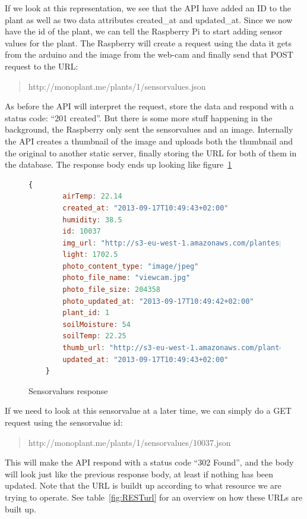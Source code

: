 If we look at this representation, we see that the API have added an ID to the plant as well as two data attributes created\_at and updated\_at. Since we now have the id of the plant, we can tell the Raspberry Pi to start adding sensor values for the plant. The Raspberry will create a request using the data it gets from the arduino and the image from the web-cam and finally send that POST request to the URL:

\begin{quote}
http://monoplant.me/plants/1/sensorvalues.json 
\end{quote}

As before the API will interpret the request, store the data and respond with a status code: “201 created”. But there is some more stuff happening in the background, the Raspberry only sent the sensorvalues and an image. Internally the API creates a thumbnail of the image and uploads both the thumbnail and the original to another static server, finally storing the URL for both of them in the database. The response body ends up looking like figure~\ref{fig:sensorvaluesresponse}

\begin{figure}
	\begin{lstlisting}[language=javascript]
	{
		airTemp: 22.14
		created_at: "2013-09-17T10:49:43+02:00"
		humidity: 38.5
		id: 10037
		img_url: "http://s3-eu-west-1.amazonaws.com/plantespann/2013/9/17/original/10037.jpg?1379407782"
		light: 1702.5
		photo_content_type: "image/jpeg"
		photo_file_name: "viewcam.jpg"
		photo_file_size: 204358
		photo_updated_at: "2013-09-17T10:49:42+02:00"
		plant_id: 1
		soilMoisture: 54
		soilTemp: 22.25
		thumb_url: "http://s3-eu-west-1.amazonaws.com/plantespann/2013/9/17/thumb/10037.jpg?1379407782"
		updated_at: "2013-09-17T10:49:43+02:00"
	}
	\end{lstlisting}
	\caption{Sensorvalues response}
	\label{fig:sensorvaluesresponse}
\end{figure}

If we need to look at this sensorvalue at a later time, we can simply do a GET request using the sensorvalue id:

\begin{quote}
http://monoplant.me/plants/1/sensorvalues/10037.json 
\end{quote}

This will make the API respond with a status code “302 Found”, and the body will look just like the previous response body, at least if nothing has been updated. Note that the URL is buildt up according to what resource we are trying to operate. See table~\ref{fig:RESTurl} for an overview on how these URLs are built up.

